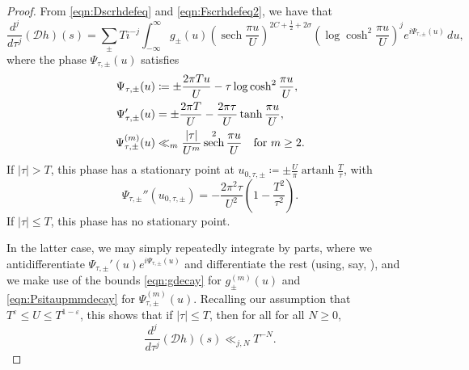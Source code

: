 \documentclass[11pt,a4paper]{amsart}
\newcommand{\Dscr}{\mathscr{D}}
\newcommand{\e}{\varepsilon}
\DeclareMathOperator{\artanh}{artanh}
\DeclareMathOperator{\sech}{sech}
\numberwithin{equation}{section}
\theoremstyle{remark}
\theoremstyle{definition}
\begin{document}
\begin{proof}
From \eqref{eqn:Dscrhdefeq} and \eqref{eqn:Fscrhdefeq2}, we have that
\begin{equation}
\label{eqn:Dscrhjint1}
\frac{d^j}{d\tau^j} (\Dscr h)(s) = \sum_{\pm} T i^{-j} \int_{-\infty}^{\infty} g_{\pm}(u) \left(\sech \frac{\pi u}{U}\right)^{2C + \frac{1}{2} + 2\sigma} \left(\log \cosh^2 \frac{\pi u}{U}\right)^j e^{i \Psi_{\tau,\pm}(u)} \, du,	
\end{equation}
where the phase $\Psi_{\tau,\pm}(u)$ satisfies
\begin{align}
\label{eqn:Psitaupmdefeq}
\Psi_{\tau,\pm}(u) & \coloneqq \pm \frac{2\pi T u}{U} - \tau \log \cosh^2 \frac{\pi u}{U},	\\
\notag
\Psi_{\tau,\pm}'(u) & = \pm \frac{2\pi T}{U} - \frac{2\pi \tau}{U} \tanh \frac{\pi u}{U},	\\
\label{eqn:Psitaupmmdecay}
\Psi_{\tau,\pm}^{(m)}(u) & \ll_m \frac{|\tau|}{U^m} \sech^2 \frac{\pi u}{U} \quad \text{for $m \geq 2$.}
\end{align}
If $|\tau| > T$, this phase has a stationary point at $u_{0,\tau,\pm} \coloneqq \pm \frac{U}{\pi} \artanh \frac{T}{\tau}$, with
\[\Psi_{\tau,\pm}''(u_{0,\tau,\pm}) = -\frac{2\pi^2 \tau}{U^2} \left(1 - \frac{T^2}{\tau^2}\right).\]
If $|\tau| \leq T$, this phase has no stationary point.

In the latter case, we may simply repeatedly integrate by parts, where we antidifferentiate $\Psi_{\tau,\pm}'(u) e^{i\Psi_{\tau,\pm}(u)}$ and differentiate the rest (using, say, \cite[Lemma 3.1 (1)]{KPY19}), and we make use of the bounds \eqref{eqn:gdecay} for $g_{\pm}^{(m)}(u)$ and \eqref{eqn:Psitaupmmdecay} for $\Psi_{\tau,\pm}^{(m)}(u)$. Recalling our assumption that $T^{\e} \leq U \leq T^{1 - \e}$, this shows that if $|\tau| \leq T$, then for all for all $N \geq 0$,
\[\frac{d^j}{d\tau^j}(\Dscr h)(s) \ll_{j,N} T^{-N}.\]


\end{proof}
\end{document}
